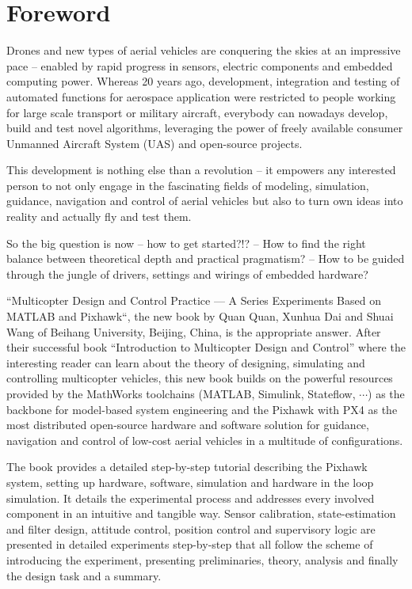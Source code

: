 
\chapter*{Foreword}

Drones and new types of aerial vehicles are conquering the skies at
an impressive pace -- enabled by rapid progress in sensors, electric
components and embedded computing power. Whereas 20 years ago, development,
integration and testing of automated functions for aerospace application
were restricted to people working for large scale transport or military
aircraft, everybody can nowadays develop, build and test novel algorithms,
leveraging the power of freely available consumer Unmanned Aircraft
System (UAS) and open-source projects.

This development is nothing else than a revolution -- it empowers
any interested person to not only engage in the fascinating fields
of modeling, simulation, guidance, navigation and control of aerial
vehicles but also to turn own ideas into reality and actually fly
and test them.

So the big question is now -- how to get started?!? -- How to find
the right balance between theoretical depth and practical pragmatism?
-- How to be guided through the jungle of drivers, settings and wirings
of embedded hardware?

``Multicopter Design and Control Practice --- A Series Experiments
Based on MATLAB and Pixhawk``, the new book by Quan Quan, Xunhua
Dai and Shuai Wang of Beihang University, Beijing, China, is the appropriate
answer. After their successful book ``Introduction to Multicopter
Design and Control'' where the interesting reader can learn about
the theory of designing, simulating and controlling multicopter vehicles,
this new book builds on the powerful resources provided by the MathWorks
toolchains (MATLAB, Simulink, Stateflow, $\cdots$) as the backbone
for model-based system engineering and the Pixhawk with PX4 as the
most distributed open-source hardware and software solution for guidance,
navigation and control of low-cost aerial vehicles in a multitude
of configurations.

The book provides a detailed step-by-step tutorial describing the
Pixhawk system, setting up hardware, software, simulation and hardware
in the loop simulation. It details the experimental process and addresses
every involved component in an intuitive and tangible way. Sensor
calibration, state-estimation and filter design, attitude control,
position control and supervisory logic are presented in detailed experiments
step-by-step that all follow the scheme of introducing the experiment,
presenting preliminaries, theory, analysis and finally the design
task and a summary.

